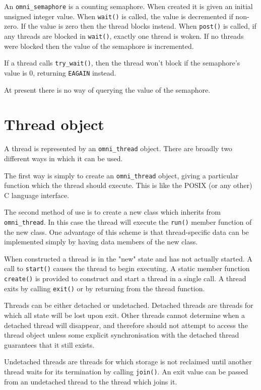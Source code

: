 \documentclass[11pt,twoside,onecolumn]{article}
\begin{document}
An {\tt omni\_semaphore} is a counting semaphore.  When created it is given an
initial unsigned integer value.  When {\tt wait()} is called, the value is
decremented if non-zero.  If the value is zero then the thread blocks instead.
When {\tt post()} is called, if any threads are blocked in {\tt wait()},
exactly one thread is woken. If no threads were blocked then the value of the
semaphore is incremented.

If a thread calls {\tt try\_wait()}, then the thread won't block if the
semaphore's value is 0, returning {\tt EAGAIN} instead.

At present there is no way of querying the value of the semaphore.



\section{Thread object}

A thread is represented by an {\tt omni\_thread} object.  There are broadly two
different ways in which it can be used.

The first way is simply to create an {\tt omni\_thread} object, giving a
particular function which the thread should execute.  This is like the POSIX
(or any other) C language interface.

The second method of use is to create a new class which inherits from {\tt
omni\_thread}.  In this case the thread will execute the {\tt run()} member
function of the new class.  One advantage of this scheme is that
thread-specific data can be implemented simply by having data members of the
new class.

When constructed a thread is in the "new" state and has not actually started.
A call to {\tt start()} causes the thread to begin executing.  A static member
function {\tt create()} is provided to construct and start a thread in a single
call.  A thread exits by calling {\tt exit()} or by returning from the thread
function.

Threads can be either detached or undetached.  Detached threads are threads for
which all state will be lost upon exit.  Other threads cannot determine when a
detached thread will disappear, and therefore should not attempt to access the
thread object unless some explicit synchronisation with the detached thread
guarantees that it still exists.

Undetached threads are threads for which storage is not reclaimed until another
thread waits for its termination by calling {\tt join()}.  An exit value can be
passed from an undetached thread to the thread which joins it.
\end{document}

